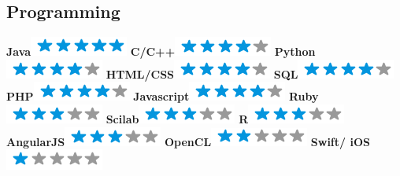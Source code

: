 \documentclass[]{friggeri-cv}
\begin{document}
\begin{aside}
  \section{Programming}
    \textbf{Java}\includegraphics[scale=0.40]{img/5stars.png}  
    \textbf{C/C++}\includegraphics[scale=0.40]{img/4stars.png}
    \textbf{Python}\includegraphics[scale=0.4]{img/4stars.png}
    \textbf{HTML/CSS}\includegraphics[scale=0.4]{img/4stars.png}
    \textbf{SQL}\includegraphics[scale=0.4]{img/4stars.png}
    \textbf{PHP}\includegraphics[scale=0.4]{img/4stars.png}
     \textbf{Javascript}\includegraphics[scale=0.4]{img/4stars.png}
    \textbf{Ruby}\includegraphics[scale=0.4]{img/3stars.png}
    \textbf{Scilab}\includegraphics[scale=0.4]{img/3stars.png}
    \textbf{R}\includegraphics[scale=0.4]{img/3stars.png}
    \textbf{AngularJS}\includegraphics[scale=0.4]{img/3stars.png}  
    \textbf{OpenCL}\includegraphics[scale=0.4]{img/2stars.png} 
    \textbf{Swift/ iOS}\includegraphics[scale=0.40]{img/1stars.png}
    ~

\end{aside}
\end{document}
